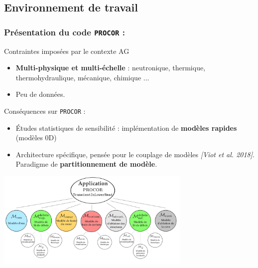 \documentclass{beamer}
\newcommand{\procor}{\texttt{PROCOR}}
\newcommand{\bib}[1]{{\color{cea_texte!80}\tiny\textit{[#1]}}}
\begin{document}
\subsection{Environnement de travail}
\begin{frame}
    \frametitle{Présentation du code \procor{} :}
    \scriptsize
      \begin{ceablock}{Contraintes imposées par le contexte AG}
		\begin{itemize}
			\item \textbf{Multi-physique et multi-échelle} : neutronique, thermique, thermohydraulique, mécanique, chimique ... 
			\item Peu de données.
		\end{itemize}
    \end{ceablock}
    \begin{ceablock}{Conséquences sur \procor{} :}
		\begin{itemize}
			\item Études statistiques de sensibilité : implémentation de \textbf{modèles rapides} (modèles 0D)
			\item Architecture spécifique, pensée pour le couplage de modèles \bib{Viot et al. 2018}. Paradigme de \textbf{partitionnement de modèle}.
		\end{itemize}
    \end{ceablock}
    \begin{center}
    	\includegraphics[width=0.7\textwidth]{Figures/applicationProcor.png}
    \end{center}
\end{frame}
\end{document}
